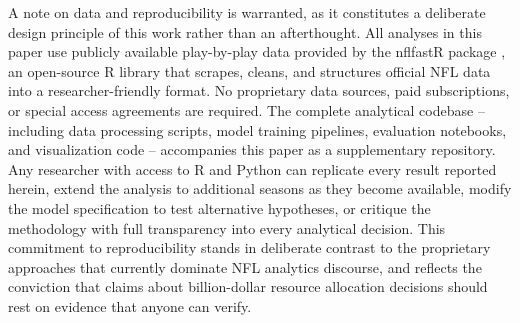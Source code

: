 A note on data and reproducibility is warranted, as it constitutes a deliberate design principle of this work rather than an afterthought. All analyses in this paper use publicly available play-by-play data provided by the nflfastR package \parencite{carl2021nflfastr}, an open-source R library that scrapes, cleans, and structures official NFL data into a researcher-friendly format. No proprietary data sources, paid subscriptions, or special access agreements are required. The complete analytical codebase  -- including data processing scripts, model training pipelines, evaluation notebooks, and visualization code  -- accompanies this paper as a supplementary repository. Any researcher with access to R and Python can replicate every result reported herein, extend the analysis to additional seasons as they become available, modify the model specification to test alternative hypotheses, or critique the methodology with full transparency into every analytical decision. This commitment to reproducibility stands in deliberate contrast to the proprietary approaches that currently dominate NFL analytics discourse, and reflects the conviction that claims about billion-dollar resource allocation decisions should rest on evidence that anyone can verify.
